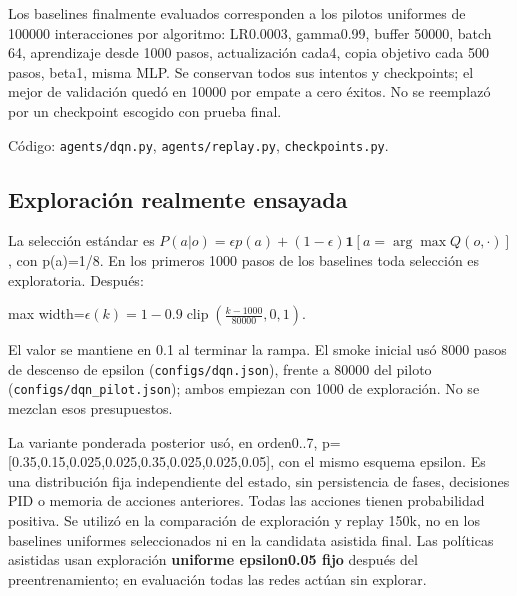 \documentclass[12pt,a4paper]{article}
\begin{document}
Los baselines finalmente evaluados corresponden a los pilotos uniformes de 100000 interacciones por algoritmo: LR0.0003,\allowbreak{} gamma0.99,\allowbreak{} buffer 50000,\allowbreak{} batch 64,\allowbreak{} aprendizaje desde 1000 pasos,\allowbreak{} actualización cada4,\allowbreak{} copia objetivo cada 500 pasos,\allowbreak{} beta1,\allowbreak{} misma MLP. Se conservan todos sus intentos y checkpoints; el mejor de validación quedó en 10000 por empate a cero éxitos. No se reemplazó por un checkpoint escogido con prueba final.


Código: \textcolor{Accent}{\nolinkurl{agents/dqn.py}},\allowbreak{} \textcolor{Accent}{\nolinkurl{agents/replay.py}},\allowbreak{} \nolinkurl{checkpoints.py}.



\subsection{Exploración realmente ensayada}
La selección estándar es $P(a|o)=\epsilon p(a)+(1-\epsilon)\mathbf1[a=\arg\max Q(o,\cdot)]$,\allowbreak{} con p(a)=1/\allowbreak{}8. En los primeros 1000 pasos de los baselines toda selección es exploratoria. Después:



\begin{center}\begin{adjustbox}{max width=\linewidth}$\displaystyle \epsilon(k)=1-0.9\operatorname{clip}\left(\frac{k-1000}{80000},0,1\right).$\end{adjustbox}\end{center}



El valor se mantiene en 0.1 al terminar la rampa. El smoke inicial usó 8000 pasos de descenso de epsilon (\nolinkurl{configs/dqn.json}),\allowbreak{} frente a 80000 del piloto (\nolinkurl{configs/dqn_pilot.json}); ambos empiezan con 1000 de exploración. No se mezclan esos presupuestos.


La variante ponderada posterior usó,\allowbreak{} en orden0..7,\allowbreak{} p=[0.35,\allowbreak{}0.15,\allowbreak{}0.025,\allowbreak{}0.025,\allowbreak{}0.35,\allowbreak{}0.025,\allowbreak{}0.025,\allowbreak{}0.05],\allowbreak{} con el mismo esquema epsilon. Es una distribución fija independiente del estado,\allowbreak{} sin persistencia de fases,\allowbreak{} decisiones PID o memoria de acciones anteriores. Todas las acciones tienen probabilidad positiva. Se utilizó en la comparación de exploración y replay 150k,\allowbreak{} no en los baselines uniformes seleccionados ni en la candidata asistida final. Las políticas asistidas usan exploración \textbf{uniforme epsilon0.05 fijo} después del preentrenamiento; en evaluación todas las redes actúan sin explorar.
\end{document}
